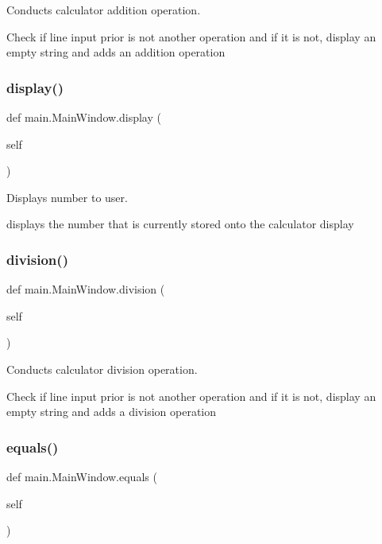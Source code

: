 Conducts calculator addition operation. 

Check if line input prior is not another operation and if it is not, display an empty string and adds an addition operation \mbox{\label{classmain_1_1_main_window_a86f6db688a227bf7a9228ef5ab650d31}} 
\subsubsection{\texorpdfstring{display()}{display()}}
{\footnotesize\ttfamily def main.\+Main\+Window.\+display (\begin{DoxyParamCaption}\item[{}]{self }\end{DoxyParamCaption})}



Displays number to user. 

displays the number that is currently stored onto the calculator display \mbox{\label{classmain_1_1_main_window_a74162ce8832ff39d12773e129aaca8fb}} 
\subsubsection{\texorpdfstring{division()}{division()}}
{\footnotesize\ttfamily def main.\+Main\+Window.\+division (\begin{DoxyParamCaption}\item[{}]{self }\end{DoxyParamCaption})}



Conducts calculator division operation. 

Check if line input prior is not another operation and if it is not, display an empty string and adds a division operation \mbox{\label{classmain_1_1_main_window_a153d3cd5e2476e7f262d67600c77c1fc}} 
\subsubsection{\texorpdfstring{equals()}{equals()}}
{\footnotesize\ttfamily def main.\+Main\+Window.\+equals (\begin{DoxyParamCaption}\item[{}]{self }\end{DoxyParamCaption})}



